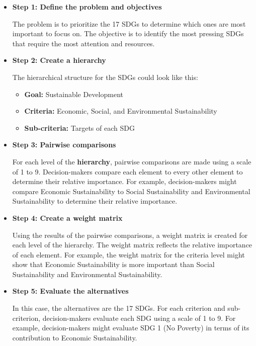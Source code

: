 \begin{itemize}


    \item \textbf{Step 1: Define the problem and objectives}
        
    The problem is to prioritize the 17 SDGs to determine which ones are most important to focus on. The objective is to identify the most pressing SDGs that require the most attention and resources.

    \item \textbf{Step 2: Create a hierarchy}
    
    The hierarchical structure for the SDGs could look like this:
    \begin{itemize}
        \item\textbf{Goal:} Sustainable Development
        \item \textbf{Criteria:} Economic, Social, and Environmental Sustainability
        \item \textbf{Sub-criteria:} Targets of each SDG
    \end{itemize}


    \item \textbf{Step 3: Pairwise comparisons}
    
    For each level of the \textbf{hierarchy}, pairwise comparisons are made using a scale of 1 to 9. Decision-makers compare each element to every other element to determine their relative importance. For example, decision-makers might compare Economic Sustainability to Social Sustainability and Environmental Sustainability to determine their relative importance.

    \item \textbf{Step 4: Create a weight matrix}
    
    Using the results of the pairwise comparisons, a weight matrix is created for each level of the hierarchy. The weight matrix reflects the relative importance of each element. For example, the weight matrix for the criteria level might show that Economic Sustainability is more important than Social Sustainability and Environmental Sustainability.

    \item \textbf{Step 5: Evaluate the alternatives}
    
    In this case, the alternatives are the 17 SDGs. For each criterion and sub-criterion, decision-makers evaluate each SDG using a scale of 1 to 9. For example, decision-makers might evaluate SDG 1 (No Poverty) in terms of its contribution to Economic Sustainability.


\end{itemize}
